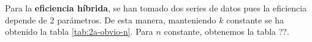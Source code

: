 Para la \textbf{eficiencia híbrida}, se han tomado dos series de datos pues la eficiencia depende de 2 parámetros.
De esta manera, manteniendo $k$ constante se ha obtenido la tabla \ref{tab:2a-obvio-n}. 
Para $n$ constante, obtenemos la tabla ??. 




